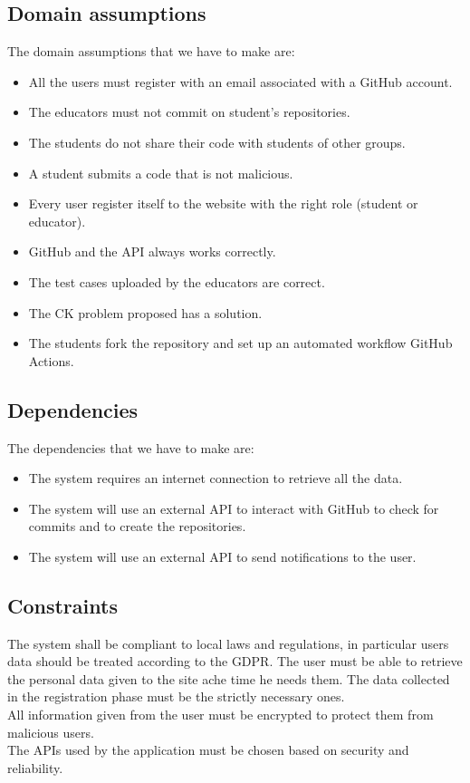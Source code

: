 \documentclass[12pt, a4paper]{report}
\begin{document}
    \subsection{Domain assumptions}
    The domain assumptions that we have to make are: 
    \begin{itemize}
        \item All the users must register with an email associated with a GitHub account. 
        \item The educators must not commit on student's repositories. 
        \item The students do not share their code with students of other groups. 
        \item A student submits a code that is not malicious. 
        \item Every user register itself to the website with the right role (student or educator).
        \item GitHub and the API always works correctly. 
        \item The test cases uploaded by the educators are correct. 
        \item The CK problem proposed has a solution. 
        \item The students fork the repository and set up an automated workflow GitHub Actions. 
    \end{itemize}

    \subsection{Dependencies}
    The dependencies that we have to make are: 
    \begin{itemize}
        \item The system requires an internet connection to retrieve all the data. 
        \item The system will use an external API to interact with GitHub to check for commits and to create the repositories.
        \item The system will use an external API to send notifications to the user. 
    \end{itemize}

    \subsection{Constraints}
    The system shall be compliant to local laws and regulations, in particular users data should be treated according to the GDPR. 
    The user must be able to retrieve the personal data given to the site ache time he needs them. 
    The data collected in the registration phase must be the strictly necessary ones. \\
    All information given from the user must be encrypted to protect them from malicious users. \\
    The APIs used by the application must be chosen based on security and reliability.
\end{document}
